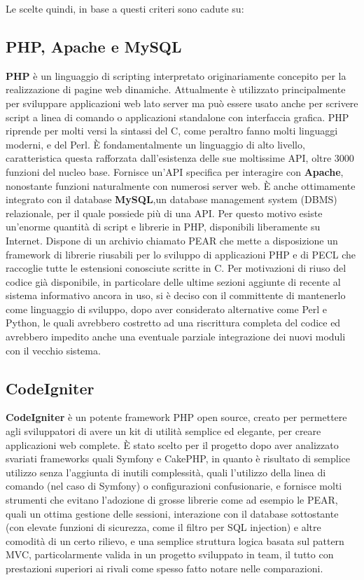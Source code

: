 Le scelte quindi, in base a questi criteri sono cadute su:
\subsection{PHP, Apache e MySQL}
\textbf{PHP} \`e un linguaggio di scripting interpretato originariamente concepito per la realizzazione
 di pagine web dinamiche. Attualmente \`e utilizzato principalmente per sviluppare applicazioni web lato server ma pu\`o essere 
usato anche per scrivere script a linea di comando o applicazioni standalone con interfaccia grafica.
PHP riprende per molti versi la sintassi del C, come peraltro fanno molti linguaggi moderni, e del Perl. 
\`E fondamentalmente un linguaggio di alto livello, caratteristica questa rafforzata dall'esistenza delle sue
 moltissime API, oltre 3000 funzioni del nucleo base.
Fornisce un'API specifica per interagire con \textbf{Apache}, nonostante funzioni naturalmente con numerosi server web. 
\`E anche ottimamente integrato con il database \textbf{MySQL},un database management system (DBMS) relazionale, per il quale
 possiede pi\`u di una API. Per questo motivo esiste un'enorme quantit\`a di script e librerie in PHP, disponibili 
liberamente su Internet.
Dispone di un archivio chiamato PEAR che mette a disposizione un framework di librerie riusabili per lo sviluppo di 
applicazioni PHP e di PECL che raccoglie tutte le estensioni conosciute scritte in C.
Per motivazioni di riuso del codice gi\`a disponibile, in particolare delle ultime sezioni aggiunte di recente al sistema
informativo ancora in uso, si \`e deciso con il committente di mantenerlo come linguaggio di sviluppo, dopo aver considerato 
alternative come Perl e Python, le quali avrebbero costretto ad una riscrittura completa del codice ed avrebbero impedito anche
una eventuale parziale integrazione dei nuovi moduli con il vecchio sistema.

\subsection{CodeIgniter}
\textbf{CodeIgniter} \` e un potente framework PHP open source, creato per
permettere agli sviluppatori di avere un kit di utilit\` a semplice ed elegante,
per creare applicazioni web complete. \` E stato scelto per il progetto dopo
aver analizzato svariati frameworks quali Symfony e CakePHP, in quanto \` e
risultato di semplice utilizzo senza l'aggiunta di inutili complessit\` a, quali
l'utilizzo della linea di comando (nel caso di Symfony) o configurazioni
confusionarie, e fornisce molti strumenti che evitano l'adozione di grosse
librerie come ad esempio le PEAR, quali un ottima gestione delle sessioni,
interazione con il database sottostante (con elevate funzioni di sicurezza, come il filtro per SQL injection) 
e altre comodit\` a di un certo rilievo, e una semplice struttura logica basata sul pattern MVC, particolarmente valida
in un progetto sviluppato in team, il tutto con prestazioni superiori ai rivali
come spesso fatto notare nelle comparazioni.

